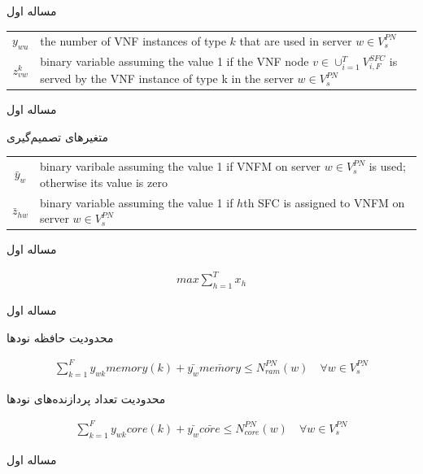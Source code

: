 \documentclass{beamer}
\begin{document}
\begin{persian}
\begin{frame}{مساله اول}
\begin{latin}
\begin{tabular}{c p{10cm}}
		$y_{wu}$ & the number of VNF instances of type $k$ that are used in server $w \in V_s^{PN}$ \\
		$z^k_{vw}$ & binary variable assuming the value 1 if the VNF node $v \in \cup_{i=1}^{T} V_{i, F}^{SFC}$ is served by the VNF instance of type k in the server $w \in V_s^{PN}$ \\
	\end{tabular}\end{latin}
\end{frame}
\begin{frame}{مساله اول}
	\par
	متغیرهای تصمیم‌گیری
	\begin{latin}\begin{tabular}{c p{10cm}}
		$\bar{y}_w$ & binary varibale assuming the value 1 if VNFM on server $w \in V_s^{PN}$ is used; otherwise its value is zero\\
		$\bar{z}_{hw}$ & binary variable assuming the value 1 if $h$th SFC is assigned to VNFM on server $w \in V_s^{PN}$\\
	\end{tabular}\end{latin}
\end{frame}
\begin{frame}{مساله اول}
	\begin{latin}\begin{align}
	max \sum_{h=1}^Tx_h
	\end{align}\end{latin}
\end{frame}
\begin{frame}{مساله اول}
	\par
	محدودیت حافظه نودها
	\begin{latin}\begin{align}
	\sum_{k=1}^Fy_{wk} memory(k) + \bar{y_w} \bar{memory} \le N_{ram}^{PN}(w)
	\quad
	\forall w \in V_s^{PN}
	\end{align}\end{latin}
	\par
	محدودیت تعداد پردازنده‌های نودها
	\begin{latin}\begin{align}
	\sum_{k=1}^Fy_{wk} core(k) + \bar{y_w} \bar{core} \le N_{core}^{PN}(w)
	\quad
	\forall w \in V_s^{PN}
	\end{align}\end{latin}
\end{frame}
\begin{frame}{مساله اول}
	\par

\end{frame}
\end{persian}
\end{document}
